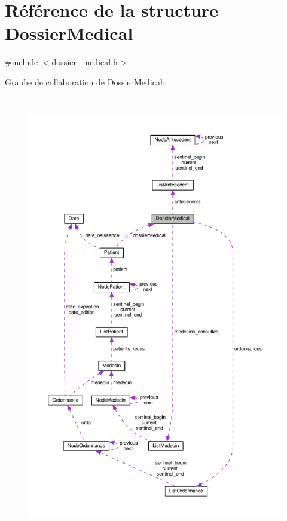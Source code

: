 \hypertarget{struct_dossier_medical}{\section{Référence de la structure Dossier\-Medical}
\label{struct_dossier_medical}
}


{\ttfamily \#include $<$dossier\-\_\-medical.\-h$>$}



Graphe de collaboration de Dossier\-Medical\-:
\nopagebreak
\begin{figure}[H]
\begin{center}
\leavevmode
\includegraphics[height=550pt]{struct_dossier_medical__coll__graph}
\end{center}
\end{figure}
